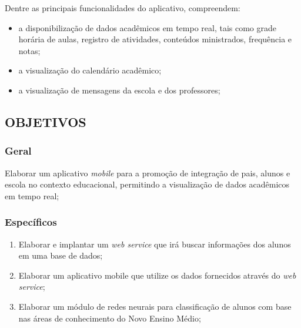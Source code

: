 Dentre as principais funcionalidades do aplicativo, compreendem:
\begin{itemize}
	\item a disponibilização de dados acadêmicos em tempo real, tais como grade horária de aulas, registro de atividades, conteúdos ministrados, frequência e notas;
	\item a visualização do calendário acadêmico;
	\item a visualização de mensagens da escola e dos professores;
\end{itemize}

\subsection{OBJETIVOS}

\subsubsection{Geral}

Elaborar um aplicativo \textit{mobile} para a promoção de integração de pais, alunos e escola no contexto educacional, permitindo a visualização de dados acadêmicos em tempo real;

\subsubsection{Específicos}

\begin{enumerate}
	\item Elaborar e implantar um \textit{web service} que irá buscar informações dos alunos em uma base de dados;
	\item Elaborar um aplicativo mobile que utilize os dados fornecidos através do \textit{web service};
	\item Elaborar um módulo de redes neurais para classificação de alunos com base nas áreas de conhecimento do Novo Ensino Médio;
\end{enumerate}
